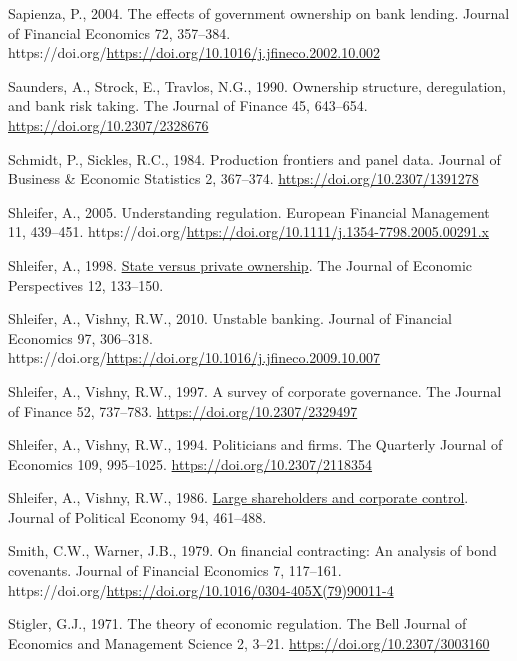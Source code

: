 \documentclass[
  12pt,
  a4paper,
]{scrreprt}
\newlength{\cslhangindent}
\newenvironment{CSLReferences}[2] %
 {\begin{list}{}{%
  \setlength{\itemindent}{0pt}
  \setlength{\leftmargin}{0pt}
  \setlength{\parsep}{0pt}
  \ifodd #1
   \setlength{\leftmargin}{\cslhangindent}
   \setlength{\itemindent}{-1\cslhangindent}
  \fi
  \setlength{\itemsep}{#2\baselineskip}}}
 {\end{list}}
\begin{document}
{{{{\begin{CSLReferences}{1}{0}
Sapienza, P., 2004. The effects of government ownership on bank lending.
Journal of Financial Economics 72, 357--384.
https://doi.org/\url{https://doi.org/10.1016/j.jfineco.2002.10.002}

Saunders, A., Strock, E., Travlos, N.G., 1990. Ownership structure,
deregulation, and bank risk taking. The Journal of Finance 45, 643--654.
\url{https://doi.org/10.2307/2328676}

Schmidt, P., Sickles, R.C., 1984. Production frontiers and panel data.
Journal of Business \& Economic Statistics 2, 367--374.
\url{https://doi.org/10.2307/1391278}

Shleifer, A., 2005. Understanding regulation. European Financial
Management 11, 439--451.
https://doi.org/\url{https://doi.org/10.1111/j.1354-7798.2005.00291.x}

Shleifer, A., 1998. \href{http://www.jstor.org/stable/2646898}{State
versus private ownership}. The Journal of Economic Perspectives 12,
133--150.

Shleifer, A., Vishny, R.W., 2010. Unstable banking. Journal of Financial
Economics 97, 306--318.
https://doi.org/\url{https://doi.org/10.1016/j.jfineco.2009.10.007}

Shleifer, A., Vishny, R.W., 1997. A survey of corporate governance. The
Journal of Finance 52, 737--783. \url{https://doi.org/10.2307/2329497}

Shleifer, A., Vishny, R.W., 1994. Politicians and firms. The Quarterly
Journal of Economics 109, 995--1025.
\url{https://doi.org/10.2307/2118354}

Shleifer, A., Vishny, R.W., 1986.
\href{http://www.jstor.org.queens.ezp1.qub.ac.uk/stable/1833044}{Large
shareholders and corporate control}. Journal of Political Economy 94,
461--488.

Smith, C.W., Warner, J.B., 1979. On financial contracting: An analysis
of bond covenants. Journal of Financial Economics 7, 117--161.
https://doi.org/\url{https://doi.org/10.1016/0304-405X(79)90011-4}

Stigler, G.J., 1971. The theory of economic regulation. The Bell Journal
of Economics and Management Science 2, 3--21.
\url{https://doi.org/10.2307/3003160}


\end{CSLReferences}}}}}
\end{document}
